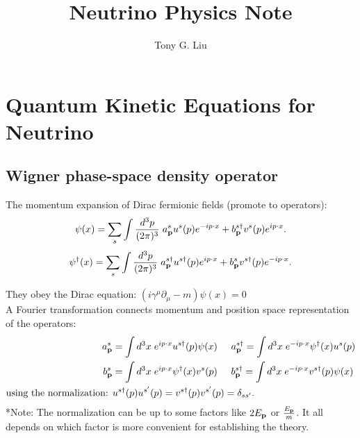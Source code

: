 \documentclass[11pt,a4paper]{article}
\title{Neutrino Physics Note}
\author{Tony G. Liu}
\begin{document}
    \maketitle
    \section{Quantum Kinetic Equations for Neutrino}%
    \label{sec:Neutrino Quantum Kinetics}
    
    \subsection{Wigner phase-space density operator}%
    \label{sub:Wigner phase-space density operator}
    The momentum expansion of Dirac fermionic fields (promote to operators):
    \[
    \psi(x) = \sum_{s}\int \frac{d^{3}p}{(2\pi)^{3}}\hspace{0.1cm} a^{s}_{\vb{p}}u^{s}(p)e^{-ip\cdot x} + b^{s \dagger}_{\vb{p}}v^{s}(p) e^{ip \cdot x}.\] 
    \[
    \psi^{\dagger}(x) = \sum_{s}\int \frac{d^{3}p}{(2\pi)^{3}}\hspace{0.1cm} a^{s \dagger}_{\vb{p}}u^{s \dagger}(p)e^{ip\cdot x} + b^{s}_{\vb{p}}v^{s \dagger}(p) e^{-ip \cdot x}.\] 
   
    \noindent They obey the Dirac equation: $(i\gamma ^{\mu} \partial _{\mu} - m) \psi(x) = 0$\\

    \noindent A Fourier transformation connects momentum and position space representation of the operators:
    \begin{align*}
        a^{s}_{\vb{p}} &= \int d^{3}x \hspace{0.1cm} e^{ip \cdot x}u^{s \dagger}(p) \psi(x)   \hspace{0.5cm} a^{s \dagger}_{\vb{p}} = \int d^{3}x \hspace{0.1cm} e^{-ip \cdot x} \psi^{\dagger}(x) u^{s}(p)\\
        b^{s}_{\vb{p}} &= \int d^{3}x \hspace{0.1cm} e^{ip \cdot x} \psi ^{\dagger}(x)v^{s}(p)  \hspace{0.5cm} b^{s \dagger}_{\vb{p}} = \int d^{3}x \hspace{0.1cm} e^{-ip \cdot x} v^{s \dagger}(p) \psi(x)\\
        \text{using the normalization: } & u^{s\dagger}(p)u^{s^{\prime}}(p) = v^{s \dagger}(p)v^{s^{\prime}}(p) = \delta_{ss^{\prime}}.
    \end{align*}
*Note: The normalization can be up to some factors like $2E_{\vb{p}}$ or $\frac{E_{\vb{p}}}{m}$. It all depends on which factor is more convenient for establishing the theory.\\
\end{document}
